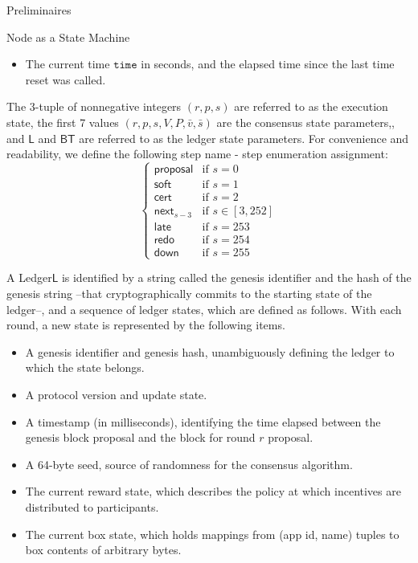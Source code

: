 \documentclass[10pt,a4paper]{article}
\begin{document}
\begin{section}{Preliminaires}
\begin{subsection}{Node as a State Machine}
\begin{itemize}
    \item 
    The current time $\mathtt{time}$ in seconds, and the elapsed time since the last
    time reset was called.
\end{itemize}
The 3-tuple of nonnegative integers $(r, p, s)$ are referred to as the {\sf execution state},
the first 7 values $(r, p, s, V, P, \bar{v}, \bar{s})$ are the 
{\sf consensus state parameters},,
and $\mathsf{L}$ and $\mathsf{BT}$ are referred to as the {\sf ledger state parameters}.
For convenience and readability, we define the following step name - step enumeration assignment:
\begin{equation}\label{table:s}
\left\{    
    \begin{array}{ll}
        \mathsf{proposal}&\mbox{if }s=0 \\
        \mathsf{soft}&\mbox{if }s=1 \\
        \mathsf{cert}&\mbox{if }s=2\\
        \mathsf{next}_{s-3}&\mbox{if }s\in [3, 252]\\
        \mathsf{late}&\mbox{if }s=253\\
        \mathsf{redo}&\mbox{if }s=254\\
        \mathsf{down}&\mbox{if }s=255
    \end{array}
\right.
\end{equation}

A Ledger$\mathsf{L}$  is identified by a string called the genesis identifier and 
the hash of the genesis string --that cryptographically commits to the starting state of the ledger--,
and a sequence of ledger states, which are defined as follows. With each round, a new 
state is represented by the following items.
\begin{itemize}
    \item A genesis identifier and genesis hash, unambiguously defining the ledger 
        to which the state belongs.
    \item A protocol version and update state.
    \item A timestamp (in milliseconds), identifying the time elapsed between the genesis block proposal 
        and the block for round $r$ proposal.
    \item A 64-byte seed, source of randomness for the consensus algorithm.
    \item The current reward state, which describes the policy at which incentives
        are distributed to participants.
    \item The current box state, which holds mappings from (app id, name) tuples
        to box contents of arbitrary bytes.
\end{itemize}


\end{subsection}
\end{section}
\end{document}
